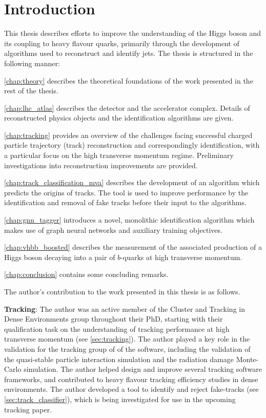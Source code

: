 \chapter{Introduction}\label{chap:intro}


This thesis describes efforts to improve the understanding of the Higgs boson and its coupling to heavy flavour quarks, primarily through the development of algorithms used to reconstruct and identify jets.
The thesis is structured in the following manner:

\cref{chap:theory} describes the theoretical foundations of the work presented in the rest of the thesis.

\cref{chap:lhc_atlas} describes the \ATLAS detector and the \CERN accelerator complex. Details of reconstructed physics objects and the \bjet identification algorithms are given.

\cref{chap:tracking} provides an overview of the challenges facing successful charged particle trajectory (track) reconstruction and correspondingly \bjet identification, with a particular focus on the high transverse momentum regime. Preliminary investigations into reconstruction improvements are provided.

\cref{chap:track_classification_mva} describes the development of an algorithm which predicts the origins of tracks. The tool is used to improve \btagging performance by the identification and removal of fake tracks before their input to the \btagging algorithms.

\cref{chap:gnn_tagger} introduces a novel, monolithic \bjet identification algorithm which makes use of graph neural networks and auxiliary training objectives.

\cref{chap:vhbb_boosted} describes the measurement of the associated production of a Higgs boson decaying into a pair of $b$-quarks at high transverse momentum.

\cref{chap:conclusion} contains some concluding remarks.


\clearpage

The author's contribution to the work presented in this thesis is as follows.

\textbf{Tracking}:
The author was an active member of the Cluster and Tracking in Dense Environments group throughout their PhD, starting with their qualification task on the understanding of tracking performance at high transverse momentum (see \cref{sec:tracking}).
The author played a key role in the validation for the tracking group of \rtwotwo of the \ATLAS software, including the validation of the quasi-stable particle interaction simulation and the radiation damage Monte-Carlo simulation. 
The author helped design and improve several tracking software frameworks, and contributed to heavy flavour tracking efficiency studies in dense environments.
The author developed a tool to identify and reject fake-tracks (see \cref{sec:track_classifier}), which is being investigated for use in the upcoming tracking paper.


